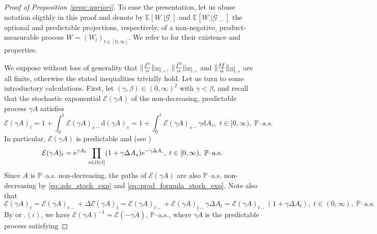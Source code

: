 \documentclass[10pt]{article} %
\newcommand\cE{\mathcal E}
\newcommand\cG{\mathcal G}
\newcommand{\smalltext}[1]{\text{\fontsize{4}{4}\selectfont$#1$}}
\def \E{\mathbb{E}}
\def \H{\mathbb{H}}
\def \P{\mathbb{P}}
\def\d{\mathrm{d}}
\begin{document}
\begin{proof}[Proof of Proposition \ref{prop::apriori}]\label{proof::apriori}
	To ease the presentation, let us abuse notation sligthly in this proof and denote by $\E[W_\cdot|\cG_\cdot]$ and $\E[W_\cdot|\cG_{\cdot-}]$ the optional and predictable projections, respectively, of a non-negative, product-measurable process $W = (W_t)_{t \in [0,\infty]}$. We refer to \cite[Section VI.2 and Appendix I]{dellacherie1982probabilities} for their existence and properties.
	
	\medskip
	We suppose without loss of generality that $\| \frac{f^1}{\alpha}\|_{\H^{\smalltext{2}}_{\smalltext{T}\smalltext{,}\smalltext{\beta}}}$, $\| \frac{f^2}{\alpha}\|_{\H^{\smalltext{2}}_{\smalltext{T}\smalltext{,}\smalltext{\beta}}}$ and $\| \frac{\delta f}{\alpha}\|_{\H^{\smalltext{2}}_{\smalltext{T}\smalltext{,}\smalltext{\beta}}}$ are all finite, otherwise the stated inequalities trivially hold. Let us turn to some introductory calculations. First, let $(\gamma,\beta) \in (0,\infty)^2$ with $\gamma < \beta$, and recall that the stochastic exponential $\cE(\gamma A)$ of the non-decreasing, predictable process $\gamma A$ satisfies
\begin{equation}\label{eq::sde_stoch_exp}
	\cE(\gamma A)_t = 1 + \int_0^t \cE(\gamma A)_{s-}  \d (\gamma A)_s = 1 + \int_0^t \cE(\gamma A)_{s-} \gamma \d A_s, \; t \in [0,\infty), \; \text{$\P$--a.s.}
\end{equation}
In particular, $\cE(\gamma A)$ is predictable and (see \cite[page 134]{jacod2003limit})
\begin{equation}\label{eq::prod_formula_stoch_exp}
	\displaystyle \cE(\gamma A)_t = \mathrm{e}^{\gamma A_t} \prod_{s \in (0,t]}(1+\gamma\Delta A_s)\mathrm{e}^{-\gamma\Delta A_\smalltext{s}}, \; t \in [0,\infty), \; \text{$\P$--a.s.}
\end{equation}
Since $A$ is $\P$--a.s. non-decreasing, the paths of $\cE(\gamma A)$ are also $\P$--a.s. non-decreasing by \eqref{eq::sde_stoch_exp} and \eqref{eq::prod_formula_stoch_exp}. Note also that
\begin{equation}\label{eq::jump_stoch_exp}
	\cE(\gamma A)_t = \cE(\gamma A)_{t-} + \Delta\cE(\gamma A)_t = \cE(\gamma A)_{t-} + \cE(\gamma A)_{t-}\gamma\Delta A_t = \cE(\gamma A)_{t-}(1+\gamma\Delta A_t), \; t \in (0,\infty), \; \text{$\P$--a.s.}
\end{equation}
By \cite[Lemma 4.4]{cohen2012existence} or .$(i)$, we have $\cE(\gamma A)^{-1} = \cE(-\overline{\gamma A})$, $\P$--a.s., where $\overline{\gamma A}$ is the predictable process satisfying

\end{proof}
\end{document}
